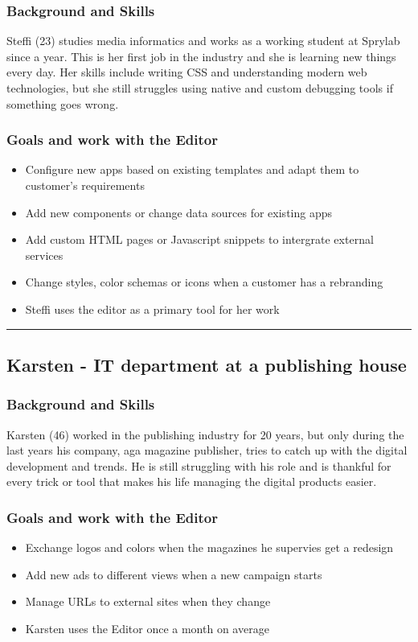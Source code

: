 \subsubsection{Background and Skills}
Steffi (23) studies media informatics and works as a working student at Sprylab since a year. This is her first job in the industry and she is learning new things every day. Her skills include writing CSS and understanding modern web technologies, but she still struggles using native and custom debugging tools if something goes wrong.  
\\
\subsubsection{Goals and work with the Editor}
\begin{itemize}
  \item Configure new apps based on existing templates and adapt them to customer's requirements
  \item Add new components or change data sources for existing apps
  \item Add custom HTML pages or Javascript snippets to intergrate external services
  \item Change styles, color schemas or icons when a customer has a rebranding
  \item Steffi uses the editor as a primary tool for her work
\end{itemize}

\hrule
\subsection{Karsten - IT department at a publishing house}
\label{subsec:persona:itpublishing}
\subsubsection{Background and Skills}
Karsten (46) worked in the publishing industry for 20 years, but only during the last years his company, aga magazine publisher, tries to catch up with the digital development and trends. He is still struggling with his role and is thankful for every trick or tool that makes his life managing the digital products easier.
\\
\subsubsection{Goals and work with the Editor}
\begin{itemize}
  \item Exchange logos and colors when the magazines he supervies get a redesign
  \item Add new ads to different views when a new campaign starts
  \item Manage URLs to external sites when they change
  \item Karsten uses the Editor once a month on average
\end{itemize}

